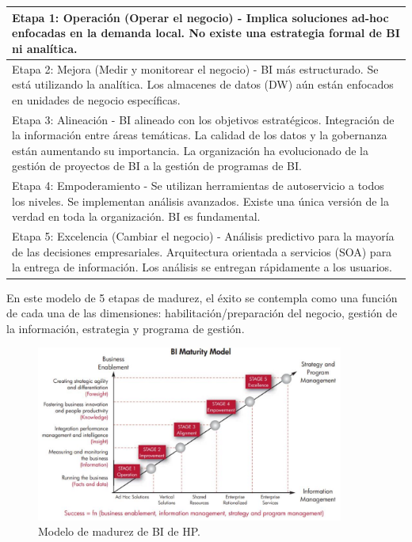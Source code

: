 \begin{table}[H]
\centering
\begin{tabular}{p{15cm}}
    \hline
    \rowcolor{gray!10} Etapa 1: Operación (Operar el negocio) - Implica soluciones ad-hoc enfocadas en la demanda local. No existe una estrategia formal de BI ni analítica. \\ \hline
    
    Etapa 2: Mejora (Medir y monitorear el negocio) - BI más estructurado. Se está utilizando la analítica. Los almacenes de datos (DW) aún están enfocados en unidades de negocio específicas. \\ \hline
    
    \rowcolor{gray!10} Etapa 3: Alineación - BI alineado con los objetivos estratégicos. Integración de la información entre áreas temáticas. La calidad de los datos y la gobernanza están aumentando su importancia. La organización ha evolucionado de la gestión de proyectos de BI a la gestión de programas de BI. \\ \hline
    
    Etapa 4: Empoderamiento - Se utilizan herramientas de autoservicio a todos los niveles. Se implementan análisis avanzados. Existe una única versión de la verdad en toda la organización. BI es fundamental. \\ \hline
    
    \rowcolor{gray!10} Etapa 5: Excelencia (Cambiar el negocio) - Análisis predictivo para la mayoría de las decisiones empresariales. Arquitectura orientada a servicios (SOA) para la entrega de información. Los análisis se entregan rápidamente a los usuarios. \\ \hline
\end{tabular}
\end{table}

En este modelo de 5 etapas de madurez, el éxito se contempla como una función de cada una de las dimensiones: habilitación/preparación del negocio, gestión de la información, estrategia y programa de gestión.

\begin{figure}[h]
\centering
\includegraphics[width=0.9\textwidth]{fotos/7.png}
\caption{Modelo de madurez de BI de HP.}
\label{fig:7}
\end{figure}

